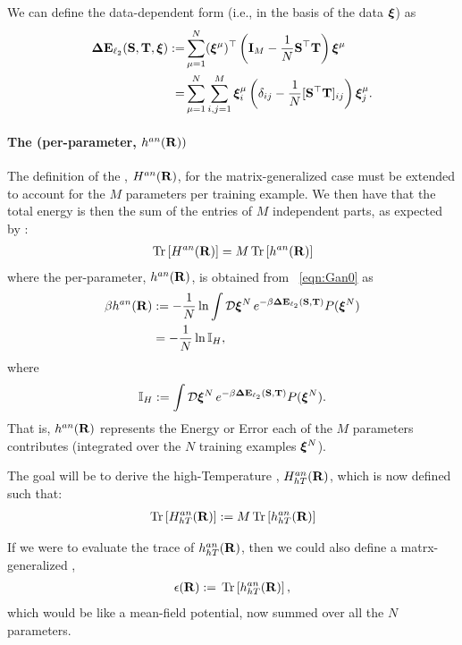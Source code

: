 We can define the data-dependent form (i.e., in the basis of the data $\boldsymbol{\xi}$) as
\begin{align}
\nonumber
\mathbf{\Delta {E}}_{\ell_2}({\mathbf{S}},{\mathbf{T}}, \boldsymbol{\xi})
   :=& \sum_{\mu=1}^{N} (\boldsymbol{\xi}^{\mu})^{\top} \left( \mathbf{I}_{M} - \frac{1}{N} {\mathbf{S}}^{\top}{\mathbf{T}} \right) \boldsymbol{\xi}^{\mu} \\
\label{eqn:DETOPNN}
    =&  \sum_{\mu=1}^{N} \sum_{i,j=1}^{M} \boldsymbol{\xi}_i^{\mu} \left( \delta_{ij} - \frac{1}{N} [{\mathbf{S}}^{\top}{\mathbf{T}}]_{ij} \right) \boldsymbol{\xi}_j^{\mu}  .
\end{align}

\paragraph{The \AnnealedHamiltonian (per-parameter, $h^{an}(\mathbf{R}))$}
The definition of the \AnnealedHamiltonian, $H^{an}(\mathbf{R})$, for the matrix-generalized case must be extended to account for the $M$ parameters per training example.  We then have that the total energy is then the sum of the entries of $M$ independent parts, as expected by \SizeConsistency:
\begin{align}
 \label{eqn:hanpp}
 \mbox{}\operatorname{Tr}\left[H^{an}(\mathbf{R})\right]=M\mbox{}\operatorname{Tr}\left[h^{an}(\mathbf{R})\right]
\end{align}
where the \AnnealedHamiltonian per-parameter, $h^{an}(\mathbf{R})$, is obtained from \EQN~\ref{eqn:Gan0} as
\begin{align}
\label{eqn:Gan_lnI}
\beta h^{an}(\mathbf{R})
   &:=-\frac{1}{N}\ln   \int\mathcal{D}\boldsymbol{\xi}^{N} \, e^{-\beta \mathbf{\Delta {E}}_{\ell_2}({\mathbf{S}},{\mathbf{T}})} P(\boldsymbol{\xi}^{N}) \\
\nonumber
   &=-\frac{1}{N}\ln \mathbb{I}_{H} ,
\end{align}
where
\begin{align}
\label{eqn:InsideGan}
\mathbb{I}_{H} := \int\mathcal{D}\boldsymbol{\xi}^{N} \, e^{-\beta \mathbf{\Delta {E}}_{\ell_2}({\mathbf{S}},{\mathbf{T}})} P(\boldsymbol{\xi}^{N}) .
\end{align}
That is, $h^{an}(\mathbf{R})$ represents the Energy or Error each of the $M$ parameters contributes
(integrated over the $N$ training examples $\boldsymbol{\xi}^{N}$).

The goal will be to derive the high-Temperature \AnnealedHamiltonian, $H^{an}_{hT}(\mathbf{R})$, which is now  defined such that:
\begin{align}
 \label{eqn:hanpp}
  \mbox{}\operatorname{Tr}\left[H^{an}_{hT}(\mathbf{R})\right]:=M\mbox{}\operatorname{Tr}\left[h^{an}_{hT}(\mathbf{R})  \right]
\end{align}

If we were to evaluate the trace of $h^{an}_{hT}(\mathbf{R})$, then we could also define
a matrx-generalized \EffectivePotential,
\begin{align}
  \label{eqn:EPSL_mat}
  \epsilon(\mathbf{R}):=\mbox{}\operatorname{Tr}\left[h^{an}_{hT}(\mathbf{R})\right],
\end{align}
which would be like a mean-field potential, now summed over all the $N$ parameters.

